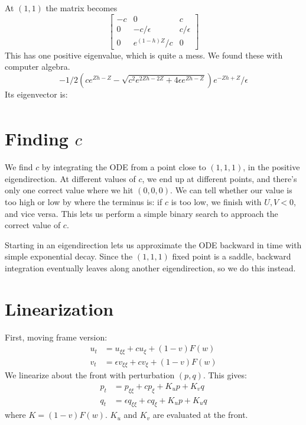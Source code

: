 \documentclass[10pt]{article}
\begin{document}
At $(1,1)$ the matrix becomes
\[
\begin{bmatrix}
-c & 0 & c \\
0 & -c/\epsilon & c/\epsilon \\
0 & e^{(1-h)Z}/c & 0
\end{bmatrix}
\]
This has one positive eigenvalue, which is quite a mess.
We found these with computer algebra.
\[
    -1/2 (c e^{Z h - Z} - \sqrt{c^2 e^{2 Z h - 2 Z} + 4 \epsilon e^{Z h -
    Z}}) e^{-Z h + Z}/\epsilon
\]
Its eigenvector is:
\begin{multline*}
    [1,\\
        -\frac{1}{2} (c^2 \epsilon e^{3 Z h - Z} - c^2 e^{3 Z h -
        Z} - ((\sqrt{c^2 e^{2 Z h - 2 Z} + 4 \epsilon e^{Z h - Z}} c + 2) \epsilon \\
        - \sqrt{c^2 e^{2 Z h - 2 Z} + 4 \epsilon e^{Z h -
        Z}} c) e^{2 Z h}) e^{-2 Z h}/\epsilon^2, \\
        \frac{1}{2} ((2 c \epsilon - c) e^{Z h} +
\sqrt{c^2 e^{Z h} + 4 \epsilon e^Z} e^{1/2 Z h}) e^{-Z h}/(c \epsilon)]
\end{multline*}


\section{Finding $c$}
We find $c$ by integrating the ODE from a point close to $(1,1,1)$, in the positive eigendirection.
At different values of $c$, we end up at different points, and there's only one correct value where we hit $(0,0,0)$.
We can tell whether our value is too high or low by where the terminus is: if $c$ is too low, we finish with $U,V < 0$, and vice versa.  This lets us perform a simple binary search to approach the correct value of $c$.

Starting in an eigendirection lets us approximate the ODE backward in time with simple exponential decay.
Since the $(1,1,1)$ fixed point is a saddle, backward integration eventually leaves along another eigendirection, so we do this instead.


\section{Linearization}
First, moving frame version:
\begin{align}
u_t &= u_{\xi\xi} + c u_\xi + (1-v)F(w) \\
v_t &= \epsilon v_{\xi\xi} + c v_\xi+ (1-v)F(w)
\end{align}
We linearize about the front with perturbation $(p,q)$.  This gives:
\begin{align}
p_t &= p_{\xi\xi} + c p_\xi + K_u p + K_v q \\
q_t &= \epsilon q_{\xi\xi} + c q_\xi+ K_u p + K_u q
\end{align}
where $K = (1-v)F(w)$.
$K_u$ and $K_v$ are evaluated at the front.
\end{document}
